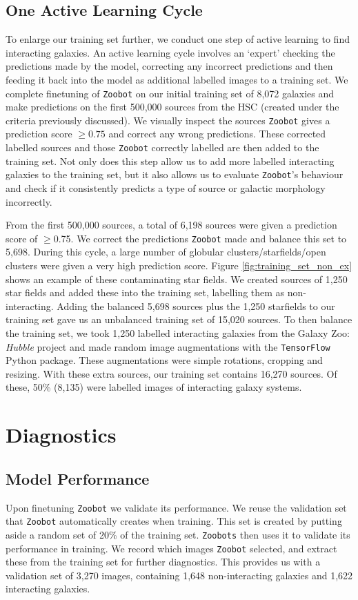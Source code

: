 \subsection{One Active Learning Cycle}
\noindent To enlarge our training set further, we conduct one step of active learning to find interacting galaxies. An active learning cycle involves an `expert' checking the predictions made by the model, correcting any incorrect predictions and then feeding it back into the model as additional labelled images to a training set. We complete finetuning of \texttt{Zoobot} on our initial training set of 8,072 galaxies and make predictions on the first 500,000 sources from the HSC (created under the criteria previously discussed). We visually inspect the sources \texttt{Zoobot} gives a prediction score $\geq0.75$ and correct any wrong predictions. These corrected labelled sources and those \texttt{Zoobot} correctly labelled are then added to the training set. Not only does this step allow us to add more labelled interacting galaxies to the training set, but it also allows us to evaluate \texttt{Zoobot}'s behaviour and check if it consistently predicts a type of source or galactic morphology incorrectly.

From the first 500,000 sources, a total of 6,198 sources were given a prediction score of $\geq$0.75. We correct the predictions \texttt{Zoobot} made and balance this set to 5,698. During this cycle, a large number of globular clusters/starfields/open clusters were given a very high prediction score. Figure \ref{fig:training_set_non_ex} shows an example of these contaminating star fields. We created sources of 1,250 star fields and added these into the training set, labelling them as non-interacting. Adding the balanced 5,698 sources plus the 1,250 starfields to our training set gave us an unbalanced training set of 15,020 sources. To then balance the training set, we took 1,250 labelled interacting galaxies from the Galaxy Zoo: \emph{Hubble} project and made random image augmentations with the \texttt{TensorFlow} Python package. These augmentations were simple rotations, cropping and resizing. With these extra sources, our training set contains 16,270 sources. Of these, 50\% (8,135) were labelled images of interacting galaxy systems.



\section{Diagnostics}\label{diagnostics}
\subsection{Model Performance} \label{performance}
\noindent Upon finetuning \texttt{Zoobot} we validate its performance. We reuse the validation set that \texttt{Zoobot} automatically creates when training. This set is created by putting aside a random set of 20\% of the training set. \texttt{Zoobots} then uses it to validate its performance in training. We record which images \texttt{Zoobot} selected, and extract these from the training set for further diagnostics. This provides us with a validation set of 3,270 images, containing 1,648 non-interacting galaxies and 1,622 interacting galaxies.

